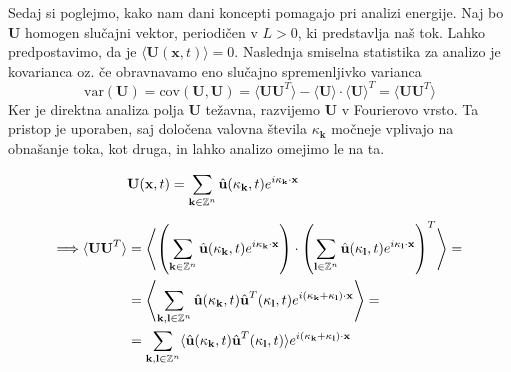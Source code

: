 \documentclass[mat2, tisk]{fmfdelo}
\newcommand{\Z}{\mathbb Z}
\newcommand{\bd}{\textbf}
\begin{document}
Sedaj si poglejmo, kako nam dani koncepti pomagajo pri analizi 
energije. Naj bo $\bd{U}$  homogen slučajni vektor, periodičen v $L>0$, ki predstavlja naš tok. 
Lahko predpostavimo, da je $\langle \bd{U}(\bd{x}, t) \rangle = 0$. Naslednja 
smiselna statistika za analizo je kovarianca oz. če obravnavamo eno 
slučajno spremenljivko varianca 
$$
\text{var}(\bd{U}) = \text{cov}(\bd{U}, \bd{U}) = \langle \bd{U} \bd{U}^T \rangle - \langle \bd{U} \rangle \cdot \langle \bd{U} \rangle^T = \langle \bd{U} \bd{U}^T \rangle
$$
Ker je direktna analiza polja \bd{U} težavna, razvijemo \bd{U}
v Fourierovo vrsto. Ta pristop je uporaben, saj določena valovna 
števila $\bd{$\kappa$}_\bd{k}$ močneje vplivajo na obnašanje toka, kot 
druga, in lahko analizo omejimo le na ta. 

\begin{align*}
&\bd{U}(\bd{x}, t) = \sum_{\bd{k}\in \Z^{n}} \hat{\bd{u}}(\bd{\text{$\kappa$}}_\bd{k}, t) e^{i\bd{\text{$\kappa$}}_\bd{k} \cdot \bd{x}}\\[2mm]
\Longrightarrow \langle \bd{U} \bd{U}^T\rangle &= \left\langle \left(\sum_{\bd{k}\in \Z^{n}} \hat{\bd{u}}(\bd{\text{$\kappa$}}_\bd{k}, t) e^{i\bd{\text{$\kappa$}}_\bd{k} \cdot \bd{x}}\right) \cdot \left(\sum_{\bd{l}\in \Z^{n}} \hat{\bd{u}}(\bd{\text{$\kappa$}}_\bd{l}, t) e^{i\bd{\text{$\kappa$}}_\bd{l} \cdot \bd{x}}\right)^T \right\rangle = \\
&= \left\langle \sum_{\bd{k}, \bd{l}\in \Z^{n}} \hat{\bd{u}}(\bd{\text{$\kappa$}}_\bd{k}, t) \hat{\bd{u}}^T(\bd{\text{$\kappa$}}_\bd{l}, t) e^{i(\bd{\text{$\kappa$}}_\bd{k} + \bd{\text{$\kappa$}}_\bd{l})\cdot \bd{x}} \right\rangle = \\
&=  \sum_{\bd{k}, \bd{l}\in \Z^{n}} \langle \hat{\bd{u}}(\bd{\text{$\kappa$}}_\bd{k}, t) \hat{\bd{u}}^T(\bd{\text{$\kappa$}}_\bd{l}, t) \rangle e^{i(\bd{\text{$\kappa$}}_\bd{k} + \bd{\text{$\kappa$}}_\bd{l})\cdot \bd{x}} 
\end{align*}
\end{document}
